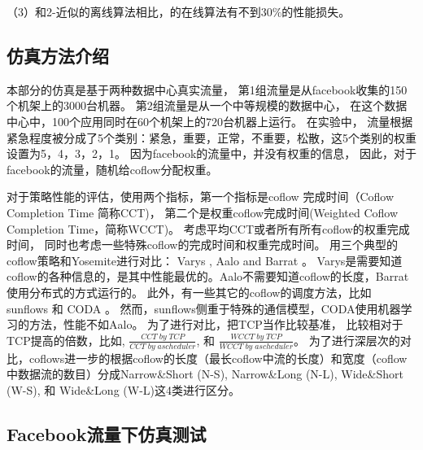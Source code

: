 （3）和2-近似的离线算法相比，的在线算法有不到$30\%$的性能损失。



\subsection{仿真方法介绍}
本部分的仿真是基于两种数据中心真实流量，
第1组流量是从facebook收集的150个机架上的3000台机器\cite{chowdhury2014efficient}。
第2组流量是从一个中等规模的数据中心，
在这个数据中心中，100个应用同时在60个机架上的720台机器上运行。
在实验中，
流量根据紧急程度被分成了5个类别：紧急，重要，正常，不重要，松散，这5个类别的权重设置为5，4，3，2，1。
因为facebook的流量中，并没有权重的信息，
因此，对于facebook的流量，随机给coflow分配权重。

对于策略性能的评估，使用两个指标，第一个指标是coflow 完成时间（Coflow Completion Time 简称CCT)，
第二个是权重coflow完成时间(Weighted Coflow Completion Time，简称WCCT)。
考虑平均CCT或者所有所有coflow的权重完成时间，
同时也考虑一些特殊coflow的完成时间和权重完成时间。
用三个典型的coflow策略和Yosemite进行对比：
Varys \cite{chowdhury2014efficient}, Aalo \cite{chowdhury2015efficient} and Barrat \cite{dogar2014decentralized}。
Varys是需要知道coflow的各种信息的，是其中性能最优的。Aalo不需要知道coflow的长度，Barrat使用分布式的方式运行的。
此外，有一些其它的coflow的调度方法，比如 sunflows \cite{huang2016sunflow} 和 CODA \cite{zhang2016coda}。
然而，sunflows侧重于特殊的通信模型，CODA使用机器学习的方法，性能不如Aalo。
为了进行对比，把TCP当作比较基准，
比较相对于TCP提高的倍数，比如, $\frac{CCT\; by\; TCP}{CCT\; by\; a scheduler}$, 和 $\frac{WCCT\; by\; TCP}{WCCT\; by\; a scheduler}$。
为了进行深层次的对比，coflows进一步的根据coflow的长度（最长coflow中流的长度）和宽度（coflow中数据流的数目）分成Narrow\&Short (N-S), Narrow\&Long (N-L), Wide\&Short (W-S), 和 Wide\&Long (W-L)这4类进行区分。


\subsection{Facebook流量下仿真测试}


